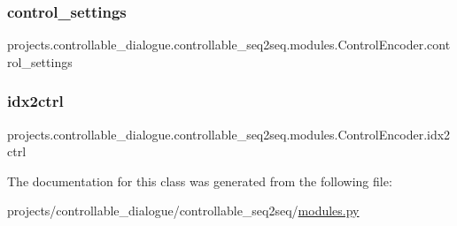 \subsubsection{\texorpdfstring{control\+\_\+settings}{control\_settings}}
{\footnotesize\ttfamily projects.\+controllable\+\_\+dialogue.\+controllable\+\_\+seq2seq.\+modules.\+Control\+Encoder.\+control\+\_\+settings}

\mbox{\label{classprojects_1_1controllable__dialogue_1_1controllable__seq2seq_1_1modules_1_1ControlEncoder_af757a0435f54ad1db6f1ada3bb6f7921}} 
\subsubsection{\texorpdfstring{idx2ctrl}{idx2ctrl}}
{\footnotesize\ttfamily projects.\+controllable\+\_\+dialogue.\+controllable\+\_\+seq2seq.\+modules.\+Control\+Encoder.\+idx2ctrl}



The documentation for this class was generated from the following file\+:\begin{DoxyCompactItemize}
\item 
projects/controllable\+\_\+dialogue/controllable\+\_\+seq2seq/\hyperlink{projects_2controllable__dialogue_2controllable__seq2seq_2modules_8py}{modules.\+py}\end{DoxyCompactItemize}
